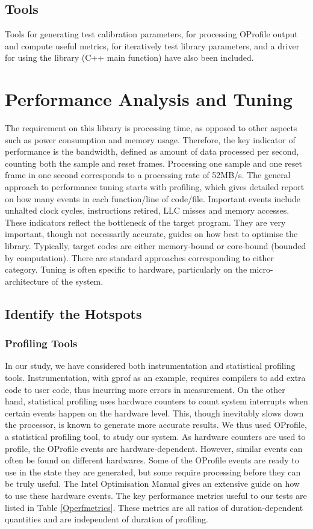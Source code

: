 \documentclass[journal]{IEEEtran}
\begin{document}
\subsection{Tools}
Tools for generating test calibration parameters, for processing OProfile output and compute useful metrics, for iteratively test library parameters, and a driver for using the library (C++ main function) have also been included.

\section{Performance Analysis and Tuning} %
\label{sec:perf}
The requirement on this library is processing time, as opposed to other aspects such as power consumption and memory usage. Therefore, the key indicator of performance is the bandwidth, defined as amount of data processed per second, counting both the sample and reset frames. Processing one sample and one reset frame in one second corresponds to a processing rate of 52MB/s. The general approach to performance tuning starts with profiling, which gives detailed report on how many events in each function/line of code/file. Important events include unhalted clock cycles, instructions retired, LLC misses and memory accesses. These indicators reflect the bottleneck of the target program. They are very important, though not necessarily accurate, guides on how best to optimise the library. Typically, target codes are either memory-bound or core-bound (bounded by computation). There are standard approaches corresponding to either category\cite{themanual}. Tuning is often specific to hardware, particularly on the micro-architecture of the system.
\subsection{Identify the Hotspots}
\subsubsection{Profiling Tools}
In our study, we have considered both instrumentation and statistical profiling tools. Instrumentation, with gprof as an example, requires compilers to add extra code to user code, thus incurring more errors in measurement. On the other hand, statistical profiling uses hardware counters to count system interrupts when certain events happen on the hardware level. This, though inevitably slows down the processor, is known to generate more accurate results. We thus used OProfile\cite{OPerf}, a statistical profiling tool, to study our system. As hardware counters are used to profile, the OProfile events are hardware-dependent. However, similar events can often be found on different hardwares. Some of the OProfile events are ready to use in the state they are generated, but some require processing before they can be truly useful. The Intel Optimisation Manual\cite{themanual} gives an extensive guide on how to use these hardware events. The key performance metrics useful to our tests are listed in Table \ref{Operfmetrics}. These metrics are all ratios of duration-dependent quantities and are independent of duration of profiling. 
\end{document}
